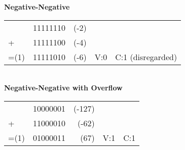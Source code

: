 \documentclass[12pt]{book}
\begin{document}
\noindent\textbf{Negative-Negative}\vspace{-1em}
\begin{table}[H]
\begin{tabular}{lrrcc}
     & 11111110 & (-2) &     &                   \\
+    & 11111100 & (-4) &     &                   \\ \cline{1-3}
=(1) & 11111010 & (-6) & V:0 & C:1 (disregarded)
\end{tabular}
\end{table}\vspace{-1em}
\\

\noindent\textbf{Negative-Negative with Overflow}\vspace{-1em}
\begin{table}[H]
\begin{tabular}{lrrcc}
     & 10000001 & (-127) &     &     \\
+    & 11000010 & (-62)  &     &     \\ \cline{1-3}
=(1) & 01000011 & (67)   & V:1 & C:1
\end{tabular}
\end{table}\vspace{-1em}
\\

\\
\end{document}
